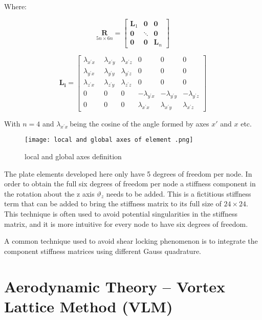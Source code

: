 Where:

\[
\underset{\text{$5n \times 6n$}}{\mathbf{R}} =
\begin{bmatrix}
\mathbf{L}_{1} & \mathbf{0} & \mathbf{0} \\
\mathbf{0} & \ddots & \mathbf{0} \\
\mathbf{0} & \mathbf{0} & \mathbf{L}_{n}
\end{bmatrix}
\]



\[\mathbf{L_i}=
\begin{bmatrix}
\lambda_{x^{'}x}\ \  & \lambda_{x^{'}y} & \lambda_{x^{'}z} & 0 & 0 & 0 \\
\lambda_{y^{'}x} & \lambda_{y^{'}y} & \lambda_{y^{'}z} & 0 & 0 & 0 \\
\lambda_{z^{'}x} & \lambda_{z^{'}y} & \lambda_{z^{'}z} & 0 & 0 & 0 \\
0 & 0 & 0 & - \lambda_{y^{'}x} & - \lambda_{y^{'}y} & - \lambda_{y^{'}z} \\
0 & 0 & 0 & \lambda_{x^{'}x} & \lambda_{x^{'}y} & \lambda_{x^{'}z}
\end{bmatrix}\]


With $n = 4$ and $\lambda_{x^{'}x}\ $being the cosine of the angle
formed by axes $x'$ and $x$ etc.

\begin{figure}[H]
    \centering
    \texttt{[image: local and global axes of element .png]}
    \caption{local and global axes definition \cite{onate2013}}
\end{figure}


The plate elements developed here only have 5 degrees of freedom per
node. In order to obtain the full six degrees of freedom per node a
stiffness component in the rotation about the z axis $\vartheta_{z}$
needs to be added. This is a fictitious stiffness term that can be added
to bring the stiffness matrix to its full size of $24 \times 24$. This
technique is often used to avoid potential singularities in the
stiffness matrix, and it is more intuitive for every node to have six
degrees of freedom.

A common technique used to avoid shear locking phenomenon is to
integrate the component stiffness matrices using different Gauss
quadrature.


\section[Aerodynamic Theory (VLM)]{Aerodynamic Theory -- Vortex Lattice Method (VLM)}
\label{aerodynamic-theory-vortex-lattice-method-vlm}

